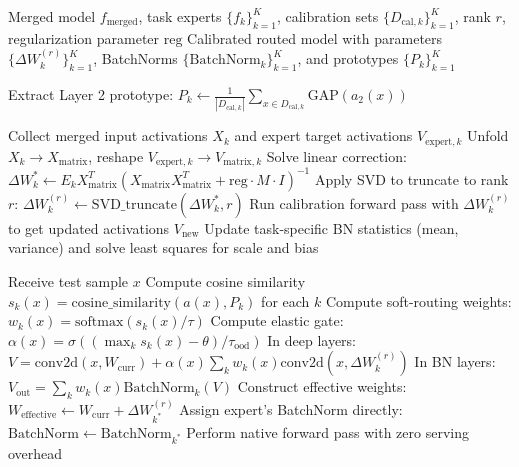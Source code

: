 \documentclass{article}
\theoremstyle{plain}
\theoremstyle{definition}
\theoremstyle{remark}
\begin{document}
\begin{algorithm}[!t]
   \caption{PSR-LRC Pipeline: Offline Calibration and Online Serving}
   \label{alg:psrlrc}
\begin{small}
\begin{algorithmic}
    Merged model $f_{\text{merged}}$, task experts $\{f_k\}_{k=1}^K$, calibration sets $\{D_{\text{cal},k}\}_{k=1}^K$, rank $r$, regularization parameter $\text{reg}$
    Calibrated routed model with parameters $\{\Delta W_k^{(r)}\}_{k=1}^K$, BatchNorms $\{\text{BatchNorm}_k\}_{k=1}^K$, and prototypes $\{P_k\}_{k=1}^K$
   
   \STATE {}
      \STATE Extract Layer 2 prototype: $P_k \leftarrow \frac{1}{|D_{\text{cal},k}|} \sum_{x \in D_{\text{cal},k}} \text{GAP}(a_2(x))$
   \ENDFOR
   
         \STATE Collect merged input activations $X_k$ and expert target activations $V_{\text{expert}, k}$
         \STATE Unfold $X_k \to X_{\text{matrix}}$, reshape $V_{\text{expert}, k} \to V_{\text{matrix}, k}$
         \STATE Solve linear correction: $\Delta W_k^* \leftarrow E_k X_{\text{matrix}}^T (X_{\text{matrix}} X_{\text{matrix}}^T + \text{reg} \cdot M \cdot I)^{-1}$
         \STATE Apply SVD to truncate to rank $r$: $\Delta W_k^{(r)} \leftarrow \text{SVD\_truncate}(\Delta W_k^*, r)$
         \STATE Run calibration forward pass with $\Delta W_k^{(r)}$ to get updated activations $V_{\text{new}}$
         \STATE Update task-specific BN statistics (mean, variance) and solve least squares for scale and bias
      \ENDFOR
   \ENDFOR
   
   \STATE {}
   \STATE Receive test sample $x$
      \STATE Compute cosine similarity $s_k(x) = \text{cosine\_similarity}(a(x), P_k)$ for each $k$
      \STATE Compute soft-routing weights: $w_k(x) = \text{softmax}(s_k(x)/\tau)$
      \STATE Compute elastic gate: $\alpha(x) = \sigma((\max_k s_k(x) - \theta)/\tau_{\text{ood}})$
      \STATE In deep layers: $V = \text{conv2d}(x, W_{\text{curr}}) + \alpha(x) \sum_k w_k(x) \text{conv2d}(x, \Delta W_k^{(r)})$
      \STATE In BN layers: $V_{\text{out}} = \sum_k w_k(x) \text{BatchNorm}_k(V)$
      \STATE Construct effective weights: $W_{\text{effective}} \leftarrow W_{\text{curr}} + \Delta W_{k^*}^{(r)}$
      \STATE Assign expert's BatchNorm directly: $\text{BatchNorm} \leftarrow \text{BatchNorm}_{k^*}$
      \STATE Perform native forward pass with zero serving overhead
   \ENDIF
\end{algorithmic}
\end{small}
\end{algorithm}
\end{document}
